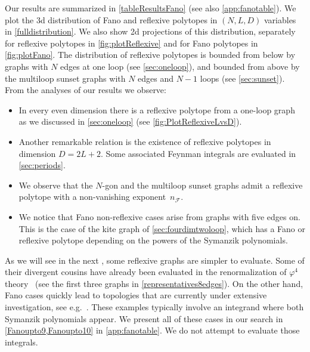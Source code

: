 \documentclass[12pt,a4paper]{article}
\theoremstyle{plain}
\theoremstyle{remark}
\newcommand{\nprops}{N}
\newcommand{\cF}{\mathscr {F}}
\begin{document}
Our results are summarized in \cref{tableResultsFano} (see also \cref{app:fanotable}). We plot the 3d
distribution of Fano and reflexive polytopes in $(\nprops, L, D)$ variables in
\cref{fulldistribution}.
We also show 2d projections of this distribution, separately for reflexive polytopes in \cref{fig:plotReflexive} and for Fano polytopes in \cref{fig:plotFano}.
The distribution of reflexive
polytopes is bounded from below by graphs with $\nprops$
edges at one loop (see \cref{sec:oneloop}), and bounded from
above by the  multiloop sunset graphs with $\nprops$ edges and
$\nprops-1$ loops (see \cref{sec:sunset}). From the analyses of our results we observe:
\begin{itemize}
\item In  every even dimension
there is a reflexive polytope from a one-loop graph as we discussed
in \cref{sec:oneloop} (see \cref{fig:PlotReflexiveLvsD}).
\item Another remarkable relation is the existence of reflexive
  polytopes in dimension $D=2L+2$. Some associated Feynman integrals are evaluated  in \cref{sec:periods}.
  \item We observe that the $\nprops$-gon and the multiloop sunset graphs admit a reflexive polytope with a non-vanishing exponent~$n_\cF$. 
  \item We notice that  Fano non-reflexive cases arise from graphs with five edges on. This is the case of the kite graph of \cref{sec:fourdimtwoloop}, which has a Fano or reflexive polytope depending on the powers of the Symanzik polynomials. 
\end{itemize}

As we will see in the next , some reflexive graphs are simpler to evaluate. Some of their divergent cousins have already been evaluated  in the renormalization of $\varphi^4$ theory~\cite{Kompaniets:2017yct} (see the first three graphs in \cref{representatives8edges}). On the other hand, Fano cases quickly lead to topologies that are currently under extensive investigation, see e.g.~\cite{Abreu:2024fei}. These examples typically involve an integrand where both Symanzik polynomials appear. We present all of these cases  in our search in \cref{Fanoupto9,Fanoupto10} in \cref{app:fanotable}. We do not attempt to evaluate those integrals. 
\end{document}
